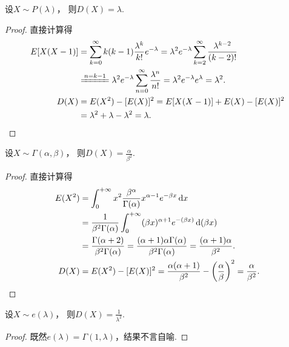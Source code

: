 \begin{proposition}
设\(X \sim P(\lambda)\)，
则\(D(X) = \lambda\).
\begin{proof}
直接计算得\begin{align*}
	E[X(X-1)]
	&= \sum_{k=0}^\infty {k(k-1) \frac{\lambda^k}{k!} e^{-\lambda}}
	= \lambda^2 e^{-\lambda} \sum_{k=2}^\infty {\frac{\lambda^{k-2}}{(k-2)!}} \\
	&\xlongequal{n=k-1} \lambda^2 e^{-\lambda} \sum_{n=0}^\infty {\frac{\lambda^n}{n!}}
	= \lambda^2 e^{-\lambda} e^\lambda = \lambda^2. \\
	D(X)
	&= E(X^2) - [E(X)]^2
	= E[X(X-1)] + E(X) - [E(X)]^2 \\
	&= \lambda^2 + \lambda - \lambda^2 = \lambda.
	\qedhere
\end{align*}
\end{proof}
\end{proposition}

\begin{proposition}\label{theorem:方差.伽马分布的方差}
设\(X \sim \Gamma(\alpha,\beta)\)，
则\(D(X) = \frac{\alpha}{\beta^2}\).
\begin{proof}
\def\inti{\int_0^{+\infty}}%
直接计算得
\begin{align*}
	E(X^2) &= \int_0^{+\infty} x^2
		\frac{\beta^\alpha}{\Gamma(\alpha)} x^{\alpha-1} e^{-\beta x} \dd{x} \\
	&= \frac{1}{\beta^2 \Gamma(\alpha)}
		\int_0^{+\infty} (\beta x)^{\alpha+1} e^{-(\beta x)} \dd(\beta x) \\
	&= \frac{\Gamma(\alpha+2)}{\beta^2 \Gamma(\alpha)}
	= \frac{(\alpha+1) \alpha \Gamma(\alpha)}{\beta^2 \Gamma(\alpha)}
	= \frac{(\alpha+1) \alpha}{\beta^2}. \\
	D(X) &= E(X^2) - [E(X)]^2
	= \frac{\alpha (\alpha+1)}{\beta^2} - \left( \frac{\alpha}{\beta} \right)^2
	= \frac{\alpha}{\beta^2}.
	\qedhere
\end{align*}
\end{proof}
\end{proposition}

\begin{proposition}\label{theorem:方差.指数分布的方差}
设\(X \sim e(\lambda)\)，
则\(D(X) = \frac{1}{\lambda^2}\).
\begin{proof}
既然\(e(\lambda) = \Gamma(1,\lambda)\)，结果不言自喻.
\end{proof}
\end{proposition}

